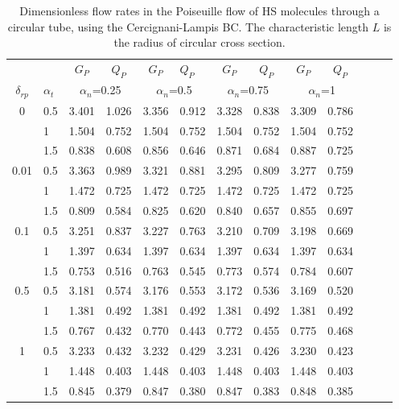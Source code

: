 \begin{table}[t]
	\centering
	\caption{Dimensionless flow rates in the Poiseuille flow of HS molecules through a circular tube, using the Cercignani-Lampis  BC.  The characteristic length $L$ is the radius of circular cross section.}
	\begin{tabular}{clccclccccccc}
		\hline
		&  & ${G}_P$ & ${Q}_P$ & ${G}_P$ & ${Q}_P$ & ${G}_P$ & ${Q}_P$ & ${G}_P$
		& ${Q}_P$ &  &  &  \\ 
		$\delta_{rp}$ & $\alpha_t$ & \multicolumn{2}{c}{$\alpha_n$=0.25} & 
		\multicolumn{2}{c}{$\alpha_n$=0.5} & \multicolumn{2}{c}{$\alpha_n$=0.75} & 
		\multicolumn{2}{c}{$\alpha_n$=1} &  &  &  \\
		\hline 
		0 & 0.5 & 3.401 & 1.026 & 3.356 & 0.912 & 3.328 & 0.838 & 3.309 & 0.786 &  & 
		&  \\ 
		& 1 & 1.504 & 0.752 & 1.504 & 0.752 & 1.504 & 0.752 & 1.504 & 0.752 &  &  & 
		\\ 
		& 1.5 & 0.838 & 0.608 & 0.856 & 0.646 & 0.871 & 0.684 & 0.887 & 0.725 &  & 
		&  \\ 
		0.01 & 0.5 & 3.363 & 0.989 & 3.321 & 0.881 & 3.295 & 0.809 & 3.277 & 0.759 & 
		&  &  \\ 
		& 1 & 1.472 & 0.725 & 1.472 & 0.725 & 1.472 & 0.725 & 1.472 & 0.725 &  &  & 
		\\ 
		& 1.5 & 0.809 & 0.584 & 0.825 & 0.620 & 0.840 & 0.657 & 0.855 & 0.697 &  & 
		&  \\ 
		0.1 & 0.5 & 3.251 & 0.837 & 3.227 & 0.763 & 3.210 & 0.709 & 3.198 & 0.669 & 
		&  &  \\ 
		& 1 & 1.397 & 0.634 & 1.397 & 0.634 & 1.397 & 0.634 & 1.397 & 0.634 &  &  & 
		\\ 
		& 1.5 & 0.753 & 0.516 & 0.763 & 0.545 & 0.773 & 0.574 & 0.784 & 0.607 &  & 
		&  \\ 
		0.5 & 0.5 & 3.181 & 0.574 & 3.176 & 0.553 & 3.172 & 0.536 & 3.169 & 0.520 & 
		&  &  \\ 
		& 1 & 1.381 & 0.492 & 1.381 & 0.492 & 1.381 & 0.492 & 1.381 & 0.492 &  &  & 
		\\ 
		& 1.5 & 0.767 & 0.432 & 0.770 & 0.443 & 0.772 & 0.455 & 0.775 & 0.468 &  & 
		&  \\ 
		1 & 0.5 & 3.233 & 0.432 & 3.232 & 0.429 & 3.231 & 0.426 & 3.230 & 0.423 &  & 
		&  \\ 
		& 1 & 1.448 & 0.403 & 1.448 & 0.403 & 1.448 & 0.403 & 1.448 & 0.403 &  &  & 
		\\ 
		& 1.5 & 0.845 & 0.379 & 0.847 & 0.380 & 0.847 & 0.383 & 0.848 & 0.385 &  & 

\end{tabular}
\end{table}
